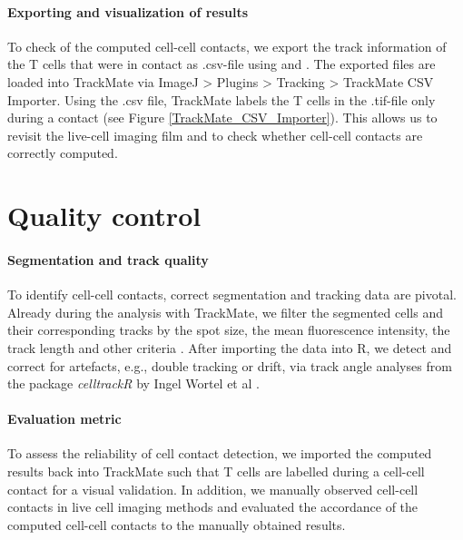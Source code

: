 \documentclass{report}
\begin{document}
\paragraph{Exporting and visualization of results}
To check of the computed cell-cell contacts, we export the track information of the T cells that were in contact as .csv-file using  and . The exported files are loaded into TrackMate via ImageJ > Plugins > Tracking > TrackMate CSV Importer. Using the .csv file, TrackMate labels the T cells in the .tif-file only during a contact (see Figure \ref{TrackMate_CSV_Importer}). This allows us to revisit the live-cell imaging film and to check whether cell-cell contacts are correctly computed.

\section{Quality control}

\paragraph{Segmentation and track quality}  To identify cell-cell contacts, correct segmentation and tracking data are pivotal. Already during the analysis with TrackMate, we filter the segmented cells and their corresponding tracks by the spot size, the mean fluorescence intensity, the track length and other criteria \citep{RN293}. After importing the data into R, we detect and correct for artefacts, e.g.,  double tracking or drift, via track angle analyses from the package \textit{celltrackR} by Ingel Wortel et al \citep{RN299}. 

\paragraph{Evaluation metric}
To assess the reliability of cell contact detection, we imported the computed results back into TrackMate such that T cells are labelled during a cell-cell contact for a visual validation. In addition, we manually observed cell-cell contacts in live cell imaging methods and evaluated the accordance of the computed cell-cell contacts to the manually obtained results.




\renewcommand{\bibname}{References}

\end{document}
